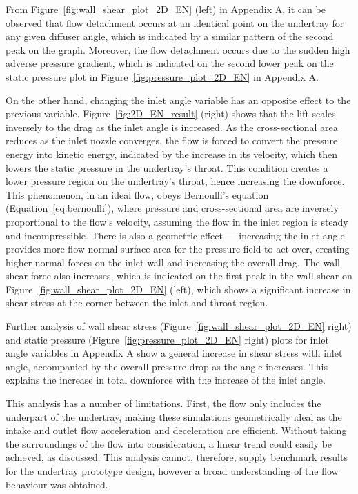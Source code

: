 \noindent From Figure~\ref{fig:wall_shear_plot_2D_EN} (left) in Appendix A, it can be observed that flow detachment occurs at an identical point on the undertray for any given diffuser angle, which is indicated by a similar pattern of the second peak on the graph. Moreover, the flow detachment occurs due to the sudden high adverse pressure gradient, which is indicated on the second lower peak on the static pressure plot in Figure~\ref{fig:pressure_plot_2D_EN} in Appendix A.

\noindent On the other hand, changing the inlet angle variable has an opposite effect to the previous variable. Figure~\ref{fig:2D_EN_result} (right) shows that the lift scales inversely to the drag as the inlet angle is increased. As the cross-sectional area reduces as the inlet nozzle converges, the flow is forced to convert the pressure energy into kinetic energy, indicated by the increase in its velocity, which then lowers the static pressure in the undertray's throat. This condition creates a lower pressure region on the undertray's throat, hence increasing the downforce. This phenomenon, in an ideal flow, obeys Bernoulli's equation (Equation~\ref{eq:bernoulli}), where pressure and cross-sectional area are inversely proportional to the flow's velocity, assuming the flow in the inlet region is steady and incompressible. There is also a geometric effect --- increasing the inlet angle provides more flow normal surface area for the pressure field to act over, creating higher normal forces on the inlet wall and increasing the overall drag. The wall shear force also increases, which is indicated on the first peak in the wall shear on Figure~\ref{fig:wall_shear_plot_2D_EN} (left), which shows a significant increase in shear stress at the corner between the inlet and throat region.

\noindent Further analysis of wall shear stress (Figure~\ref{fig:wall_shear_plot_2D_EN} right) and static pressure (Figure~\ref{fig:pressure_plot_2D_EN} right) plots for inlet angle variables in Appendix A show a general increase in shear stress with inlet angle, accompanied by the overall pressure drop as the angle increases. This explains the increase in total downforce with the increase of the inlet angle.

\noindent This analysis has a number of limitations. First, the flow only includes the underpart of the undertray, making these simulations geometrically ideal as the intake and outlet flow acceleration and deceleration are efficient. Without taking the surroundings of the flow into consideration, a linear trend could easily be achieved, as discussed. This analysis cannot, therefore, supply benchmark results for the undertray prototype design, however a broad understanding of the flow behaviour was obtained.

